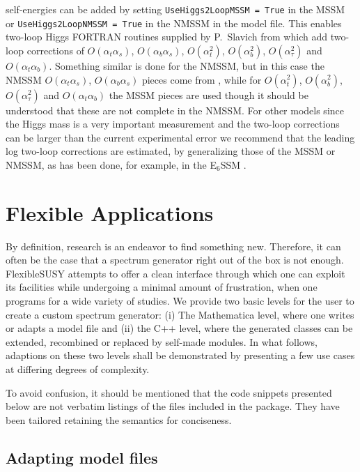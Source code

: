 \documentclass[final,3p,11pt,pdflatex]{elsarticle}
\makeatletter
\newcommand{\fs}{FlexibleSUSY\@\xspace}
\newcommand{\mathematica}{Mathematica\xspace}
\newcommand{\code}[1]{\lstinline|#1|}  %
\def\at{\alpha_t}
\def\ab{\alpha_b}
\def\as{\alpha_s}
\def\atau{\alpha_{\tau}}
\def\oatab{O(\at\ab)}
\def\oatas{O(\at\as)}
\def\oabas{O(\ab\as)}
\def\oatq{O(\at^2)}
\def\oabq{O(\ab^2)}
\def\oatauq{O(\atau^2)}
\makeatother
\begin{document}
self-energies can be added by setting \code{UseHiggs2LoopMSSM = True}
in the MSSM or \code{UseHiggs2LoopNMSSM = True} in the NMSSM in the
model file.  This enables two-loop Higgs FORTRAN routines supplied by
P.~Slavich from
\cite{Degrassi:2001yf,Brignole:2001jy,Dedes:2002dy,Brignole:2002bz,Dedes:2003km}
which add two-loop corrections of $\oatas$, $\oabas$, $\oatq$,
$\oabq$, $\oatauq$ and $\oatab$.  Something similar is
done for the NMSSM, but in this case the NMSSM $\oatas$, $\oabas$
pieces come from \cite{Degrassi:2009yq}, while for $\oatq$,
$\oabq$, $\oatauq$ and $\oatab$ the MSSM pieces are used
though it should be understood that these are not complete in the
NMSSM. For other models since the Higgs mass is a very important
measurement and the two-loop corrections can be larger than the
current experimental error \cite{Degrassi:2009yq} we recommend that
the leading log two-loop corrections are estimated, by generalizing
those of the MSSM or NMSSM, as has been done, for example, in the
E$_6$SSM \cite{King:2005jy}.

\section{Flexible Applications}
\label{sec:Flexible}

By definition, research is an endeavor to find something new.
Therefore, it can often be the case that
a spectrum generator right out of the box is not enough.
\fs attempts to offer a clean interface through which
one can exploit its facilities
while undergoing a minimal amount of frustration,
when one programs for a wide variety of studies.
We provide two basic levels for the user to create a custom spectrum
generator: (i) The \mathematica level, where one writes or
adapts a model file and (ii) the C++ level, where the generated
classes can be extended, recombined or replaced by self-made modules.
In what follows, adaptions on these two levels shall be demonstrated
by presenting a few use cases at differing degrees of complexity.

To avoid confusion,
it should be mentioned that
the code snippets presented below are not
verbatim listings of the files included in the package.
They have been tailored retaining the semantics
for conciseness.

\subsection{Adapting model files}
\label{sec:adapting-model-files}
\end{document}
